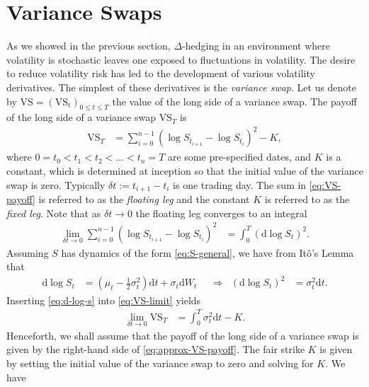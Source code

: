 \documentclass[12pt]{book}
\numberwithin{equation}{chapter}
\theoremstyle{plain}
\numberwithin{theorem}{section}
\theoremstyle{definition}
\numberwithin{exercise}{chapter}
\newcommand{\<}{\langle}
\renewcommand{\>}{\rangle}
\renewcommand{\(}{\left(}
\renewcommand{\)}{\right)}
\renewcommand{\[}{\left[}
\renewcommand{\]}{\right]}
\newcommand\del{\delta}
\newcommand\dd{\mathrm{d}}
\theoremstyle{definition}
\numberwithin{question}{section}
\begin{document}
\section{Variance Swaps}
As we showed in the previous section, $\Delta$-hedging in an environment where volatility is stochastic leaves one exposed to fluctuations in volatility.  The desire to reduce volatility risk has led to the development of various volatility derivatives.  
The simplest of these derivatives is the \textit{variance swap}. 
Let us denote by $\text{VS} = (\text{VS}_t)_{0 \leq t \leq T}$ the value of the long side of a variance swap.   
The payoff of the long side of a variance swap $\text{VS}_T$ is
\begin{align}
\text{VS}_T
	&= \sum_{i=0}^{n-1} \( \log S_{t_{i+1}} - \log S_{t_i} \)^2 - K , \label{eq:VS-payoff}
\end{align} 
where $0 = t_0 < t_1 < t_2 < \ldots < t_n = T$ are some pre-specified dates, and $K$ is a constant, which is determined at inception so that the initial value of the variance swap is zero.
Typically $\del t := t_{i+1} - t_i$ is one trading day.
The sum in \eqref{eq:VS-payoff} is referred to as the \textit{floating leg} and the constant $K$ is referred to as the \textit{fixed leg}.
Note that as $\del t \rightarrow 0$ the floating leg converges to an integral
\begin{align} 
\lim_{\del t \to 0}\sum_{i=0}^{n-1} \( \log S_{t_{i+1}} - \log S_{t_i} \)^2 
	&= \int_0^T (\dd \log S_t)^2 . \label{eq:VS-limit}
\end{align}
Assuming $S$ has dynamics of the form \eqref{eq:S-general}, we have from It\^o's Lemma that
\begin{align}
\dd \log S_t 
	&= \( \mu_t - \frac{1}{2} \sigma_t^2 \) \dd t + \sigma_t \dd W_t &
	&\Rightarrow&
(\dd \log S_t)^2 
	&= \sigma_t^2 \dd t. \label{eq:d-log-s}
\end{align}
Inserting \eqref{eq:d-log-s} into \eqref{eq:VS-limit} yields
\begin{align}
\lim_{\del t \to 0} \text{VS}_T
	&=	\int_0^T \sigma_t^2 \dd t - K. \label{eq:approx-VS-payoff} 
\end{align}
Henceforth, we shall assume that the payoff of the long side of a variance swap is given by the right-hand side of \eqref{eq:approx-VS-payoff}.
The fair strike $K$ is given by setting the initial value of the variance swap to zero and solving for $K$.  We have
\end{document}

